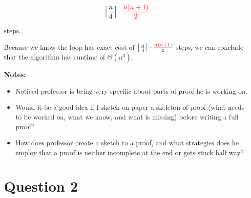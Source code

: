 \documentclass[12pt]{article}
\begin{document}
\begin{enumerate}[a.]
\begin{mdframed}
        \begin{align}
            \left\lceil \frac{n}{4} \right\rceil \cdot \color{red}\frac{n(n+1)}{2}\color{black}
        \end{align}

        steps.

        \bigskip

        Because we know the loop has exact cost of $\left\lceil \frac{n}{4}
        \right\rceil \cdot \color{red}\frac{n(n+1)}{2}\color{black}$ steps, we
        can conclude that the algorithm has runtime of $\Theta(n^3)$.

    \end{mdframed}

    \textbf{Notes:}

    \begin{itemize}
        \item Noticed professor is being very specific about parts of proof he is working on.

        \item Would it be a good idea if I sketch on paper a skeleton of proof (what needs
        to be worked on, what we know, and what is missing) before writing a full proof?

        \item How does professor create a sketch to a proof, and what strategies does he
        employ that a proof is neither incomplete at the end or gets stuck half way?

    \end{itemize}

\end{enumerate}

\section*{Question 2}
\end{document}
